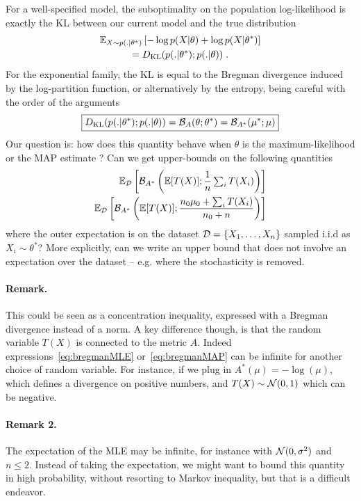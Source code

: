 \documentclass[twoside]{article}
\newcommand*{\expect}[2][]{\ensuremath{\mathbb{E}_{#1} \left[ #2 \right] }} %
\newcommand{\logpart}{A}
\newcommand{\conj}{\logpart^*}
\newcommand{\bregman}{\cB_\logpart}
\newcommand{\bregmanconj}{\cB_{\logpart^*}}
\newcommand{\natp}{\theta}
\newcommand{\meanp}{\mu}
\begin{document}
For a well-specified model, the suboptimality on the population log-likelihood is exactly the KL between our current model and the true distribution
\begin{multline}
    \expect[X\sim p(.|\natp^*)]{-\log p(X|\natp) + \log p(X|\natp^*) } \\
	= \KL( p(.|\natp^*) ; p(.|\natp)) \; .
\end{multline}
For the exponential family, the KL is equal to the Bregman divergence induced by the log-partition function, or alternatively by the entropy, being careful with the order of the arguments 
\begin{align}
\boxed{
	\KL( p(.|\natp^*) ; p(.|\natp))
    = \bregman (\natp ; \natp^*)
    = \bregmanconj ( \meanp^* ; \meanp)
}
\end{align}
Our question is: how does this quantity behave when $\natp$ is the maximum-likelihood or the MAP estimate ? Can we get upper-bounds on the following quantities
\begin{align}
	\label{eq:bregmanMLE}
	\expect[\cD]{\bregmanconj \left (\E [T(X)] ;  \inv{n}  \smallsum_i T(X_i) \right )} \\
	\label{eq:bregmanMAP}
	\expect[\cD]{\bregmanconj \left (\E [T(X)] ; \frac{n_0 \mu_0 + \smallsum_i T(X_i)}{n_0+n} \right )} 
\end{align}
where the outer expectation is on the dataset ${\mathcal D} = \{X_1, \dots, X_n \}$ sampled i.i.d as $X_i\sim \natp^*$?
More explicitly, can we write an upper bound that does not involve an expectation over the dataset -- e.g. where the stochasticity is removed.


\paragraph{Remark.}
This could be seen as a concentration inequality, expressed with a Bregman divergence instead of a norm.
A key difference though, is that the random variable $T(X)$ is connected to the metric $\logpart$. 
Indeed expressions~\eqref{eq:bregmanMLE} or~\eqref{eq:bregmanMAP} can be infinite for another choice of random variable. 
For instance, if we plug in $\conj(\mu)= -\log(\mu)$, which defines a divergence on positive numbers, and $T(X) \sim {\mathcal N}(0,1)$ which can be negative.

\paragraph{Remark 2.}
The expectation of the MLE may be infinite, for instance with ${\mathcal N}(0,\sigma^2)$ and $n\leq 2$. Instead of taking the expectation,  we might want to bound this quantity in high probability, without resorting to Markov inequality, but that is a difficult endeavor.
\end{document}
